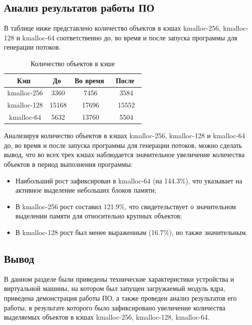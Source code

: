 \newpage

\subsection{Анализ результатов работы ПО}

В таблице ниже представлено количество объектов в кэшах kmalloc-256, kmalloc-128 и kmalloc-64 соответственно до, во время и после запуска программы для генерации потоков.

\begin{table}[H]
    \centering
    \caption{Количество объектов в кэше}
    \label{tab:table}
    \begin{tabular}{|c|c|c|c|}
        \hline
        \,\hfill \textbf{Кэш} \hfill\, & \,\hfill \textbf{До} \hfill\, & \,\hfill \textbf{Во время} \hfill\, & \,\hfill \textbf{После} \hfill\, \\ \hline
        kmalloc-256 &  3360 &  7456 &  3584 \\ \hline
        kmalloc-128 & 15168 & 17696 & 15552 \\ \hline
        kmalloc-64  &  5632 & 13760 &  5504 \\ \hline
    \end{tabular}
\end{table}

Анализируя количество объектов в кэшах kmalloc-256, kmalloc-128 и kmalloc-64 до, во время и после запуска программы для генерации потоков, можно сделать вывод, что во всех трех кэшах наблюдается значительное увеличение количества объектов в период выполнения программы:
\begin{itemize}
    \item Наибольший рост зафиксирован в kmalloc-64 (на 144.3\%), что указывает на активное выделение небольших блоков памяти;
    \item В kmalloc-256 рост составил 121.9\%, что свидетельствует о значительном выделении памяти для относительно крупных объектов;
    \item В kmalloc-128 рост был менее выраженным (16.7\%), но также значительным.
\end{itemize}

\subsection*{Вывод}

В данном разделе были приведены технические характеристики устройства и виртуальной машины, на котором был запущен загружаемый модуль ядра, приведена демонстрация работы ПО, а также проведен анализ результатов его работы, в результате которого было зафиксировано увеличение количества выделяемых объектов в кэшах kmalloc-256, kmalloc-128, kmalloc-64.
